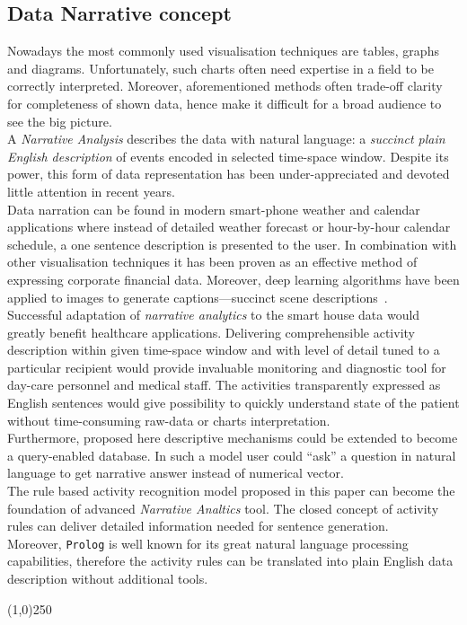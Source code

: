 \documentclass[10pt, a4paper, pdflatex, leqno, twoside, openright]{report}
\begin{document}
    \subsection{Data Narrative concept\label{sec:narrative}}
Nowadays the most commonly used visualisation techniques are tables, graphs and diagrams. Unfortunately, such charts often need expertise in a field to be correctly interpreted. Moreover, aforementioned methods often trade-off clarity for completeness of shown data, hence make it difficult for a broad audience to see the big picture.\\

A \emph{Narrative Analysis} describes the data with natural language: a \emph{succinct plain English description} of events encoded in selected time-space window. Despite its power, this form of data representation has been under-appreciated and devoted little attention in recent years.\\
Data narration can be found in modern smart-phone weather and calendar applications where instead of detailed weather forecast or hour-by-hour calendar schedule, a one sentence description is presented to the user. In combination with other visualisation techniques it has been proven as an effective method of expressing corporate financial data. Moreover, deep learning algorithms have been applied to images to generate captions---succinct scene descriptions~\citep{vinyals2014show}.\\

Successful adaptation of \emph{narrative analytics} to the smart house data would greatly benefit healthcare applications. Delivering comprehensible activity description within given time-space window and with level of detail tuned to a particular recipient would provide invaluable monitoring and diagnostic tool for day-care personnel and medical staff. The activities transparently expressed as English sentences would give possibility to quickly understand state of the patient without time-consuming raw-data or charts interpretation.\\
Furthermore, proposed here descriptive mechanisms could be extended to become a query-enabled database. In such a model user could ``ask'' a question in natural language to get narrative answer instead of numerical vector.\\

The rule based activity recognition model proposed in this paper can become the foundation of advanced \emph{Narrative Analtics} tool. The closed concept of activity rules can deliver detailed information needed for sentence generation.\\
Moreover, \texttt{Prolog} is well known for its great natural language processing capabilities, therefore the activity rules can be translated into plain English data description without additional tools.

\vfill
\begin{center}
\noindent \line(1,0){250}
\end{center}
\newpage
\thispagestyle{empty}%
\mbox{}

\cleardoublepage
{}
  {}
  
\cleardoublepage
{}
\end{document}
